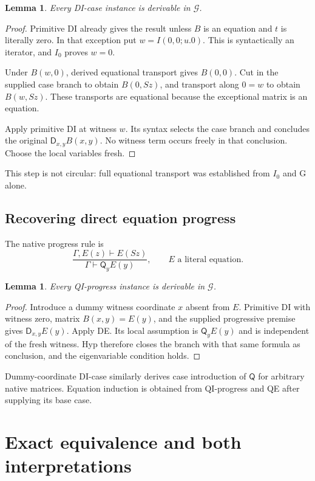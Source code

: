 \documentclass[11pt,letterpaper]{article}
\newtheorem{lemma}[theorem]{Lemma}
\theoremstyle{definition}
\theoremstyle{remark}
\newcommand{\D}{\mathsf D}
\newcommand{\Q}{\mathsf Q}
\newcommand{\Gcal}{\mathcal G}
\begin{document}
\begin{lemma}\label{new:dcase}
Every DI-case instance is derivable in $\Gcal$.
\end{lemma}
\begin{proof}
Primitive DI already gives the result unless $B$ is an equation and $t$
is literally zero. In that exception put $w=I(0,0;u.0)$.
This is syntactically an iterator, and $I_0$ proves $w=0$.

Under $B(w,0)$, derived equational transport gives $B(0,0)$.
Cut in the supplied case branch to obtain $B(0,Sz)$, and transport along
$0=w$ to obtain $B(w,Sz)$. These transports are equational because the
exceptional matrix is an equation.

Apply primitive DI at witness $w$. Its syntax selects the case branch
and concludes the original $\D_{x,y}B(x,y)$. No witness term occurs
freely in that conclusion. Choose the local variables fresh.
\end{proof}

This step is not circular: full equational transport was established
from $I_0$ and G alone.

\subsection{Recovering direct equation progress}

The native progress rule is
\[
 \frac{\Gamma,E(z)\vdash E(Sz)}
      {\Gamma\vdash\Q_yE(y)},\qquad E\text{ a literal equation}.
 \tag{QI-progress}
\]

\begin{lemma}\label{new:qprog}
Every QI-progress instance is derivable in $\Gcal$.
\end{lemma}
\begin{proof}
Introduce a dummy witness coordinate $x$ absent from $E$.
Primitive DI with witness zero, matrix $B(x,y)=E(y)$, and the supplied
progressive premise gives $\D_{x,y}E(y)$. Apply DE.
Its local assumption is $\Q_yE(y)$ and is independent of the fresh
witness. Hyp therefore closes the branch with that same formula as
conclusion, and the eigenvariable condition holds.
\end{proof}

Dummy-coordinate DI-case similarly derives case introduction of $\Q$
for arbitrary native matrices. Equation induction is obtained from
QI-progress and QE after supplying its base case.

\section{Exact equivalence and both interpretations}
\label{new:equivalence}
\end{document}
